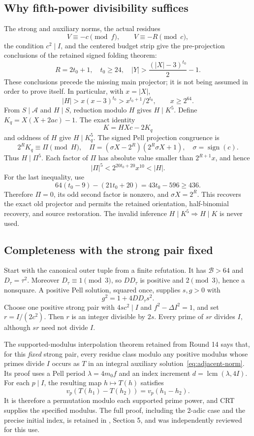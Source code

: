 \subsection{Why fifth-power divisibility suffices}
The strong and auxiliary norms, the actual residues
\[
 V\equiv-c\pmod f,\qquad V\equiv-R\pmod c,
\]
the condition $c^2\mid I$, and the centered budget strip give the
pre-projection conclusions of the retained signed folding theorem:
\[
 R=2t_0+1,\quad t_0\ge24,\quad
 |Y|>\frac{(|X|-3)^{t_0}}2-1.
\]
These conclusions precede the missing main projector; it is not being
assumed in order to prove itself. In particular, with $x=|X|$,
\[
 |H|>x(x-3)^{t_0}>x^{t_0+1}/2^{t_0},\qquad x\ge2^{64}.
\]
From $S\mid\mathcal A$ and $H\mid S$, reduction modulo $H$ gives
$H\mid K^5$. Define $K_q=X(X+2ac)-1$. The exact identity
\[
 K=HXc-2K_q
\]
and oddness of $H$ give $H\mid K_q^5$. The signed Pell projection
congruence is
\[
 2^R K_q\equiv\Pi\pmod H,
 \quad \Pi=(\sigma X-2^R)(2^R\sigma X+1),\quad
 \sigma=\operatorname{sign}(c).
\]
Thus $H\mid\Pi^5$. Each factor of $\Pi$ has absolute value smaller
than $2^{R+1}x$, and hence
\[
 |\Pi|^5<2^{20t_0+20}x^{10}<|H|.
\]
For the last inequality, use
\[
 64(t_0-9)-(21t_0+20)=43t_0-596\ge436.
\]
Therefore $\Pi=0$, its odd second factor is nonzero, and
$\sigma X=2^R$. This recovers the exact old projector and permits the
retained orientation, half-binomial recovery, and source restoration.
The invalid inference $H\mid K^5\Rightarrow H\mid K$ is never used.

\subsection{Completeness with the strong pair fixed}
Start with the canonical outer tuple from a finite refutation. It has
$\mathcal B>64$ and $D_\tau=\tau^2$. Moreover $D_\tau\equiv1\pmod3$,
so $D D_\tau$ is positive and $2\pmod3$, hence a nonsquare. A positive
Pell solution, squared once, supplies $s,g>0$ with
\[
 g^2=1+4D D_\tau s^2.
\]
Choose one positive strong pair with $4sc^2\mid I$ and
$f^2-\Delta I^2=1$, and set $r=I/(2c^2)$. Then $r$ is an integer
divisible by $2s$. Every prime of $sr$ divides $I$, although $sr$ need
not divide $I$.

The supported-modulus interpolation theorem retained from Round 14 says
that, for this \emph{fixed} strong pair, every residue class modulo any
positive modulus whose primes divide $I$ occurs as $T$ in an integral
auxiliary solution~\eqref{eq:adjacent-norm}. Its proof uses a Pell period
$\lambda=4m_0f$ and an index increment
$d=\operatorname{lcm}(\lambda,4I)$. For each $p\mid I$, the resulting
map $h\mapsto T(h)$ satisfies
\[
 v_p(T(h_1)-T(h_2))=v_p(h_1-h_2).
\]
It is therefore a permutation modulo each supported prime power, and
CRT supplies the specified modulus. The full proof, including the
2-adic case and the precise initial index, is retained in
, Section 5, and
was independently reviewed for this use.

